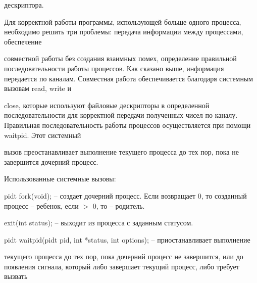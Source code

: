 \documentclass[a4paper,portrait,12pt]{article}
\begin{document}
\begin{flushleft}
дескриптора.
\end{flushleft}


\begin{flushleft}
Для корректной работы программы, использующей больше одного процесса, необходимо решить три проблемы: передача информации между процессами, обеспечение
\end{flushleft}


\begin{flushleft}
совместной работы без создания взаимных помех, определение правильной последовательности работы процессов. Как сказано выше, информация передается по каналам. Совместная работа обеспечивается благодаря системным вызовам read, write и
\end{flushleft}


\begin{flushleft}
close, которые используют файловые дескрипторы в определенной последовательности для корректной передачи полученных чисел по каналу. Правильная последовательность работы процессов осуществляется при помощи waitpid. Этот системный
\end{flushleft}


\begin{flushleft}
вызов преостанавливает выполнение текущего процесса до тех пор, пока не завершится дочерний процесс.
\end{flushleft}


\begin{flushleft}
Использованные системные вызовы:
\end{flushleft}


\begin{flushleft}
pidt fork(void); -- создает дочерний процесс. Если возвращает 0, то созданный процесс -- ребенок, если $>$ 0, то -- родитель.
\end{flushleft}


\begin{flushleft}
exit(int status); -- выходит из процесса с заданным статусом.
\end{flushleft}


\begin{flushleft}
pidt waitpid(pidt pid, int *status, int options); -- приостанавливает выполнение
\end{flushleft}


\begin{flushleft}
текущего процесса до тех пор, пока дочерний процесс не завершится, или до появления сигнала, который либо завершает текущий процесс, либо требует вызвать
\end{flushleft}
\end{document}
